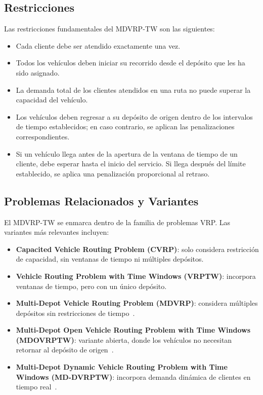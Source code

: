 \documentclass[letter, 10pt, dvipdfmx]{article}
\begin{document}
\subsection{Restricciones}

Las restricciones fundamentales del MDVRP-TW son las siguientes:

\begin{itemize}
  \item Cada cliente debe ser atendido exactamente una vez.
  \item Todos los vehículos deben iniciar su recorrido desde el depósito que les ha sido asignado.
  \item La demanda total de los clientes atendidos en una ruta no puede superar la capacidad del vehículo.
  \item Los vehículos deben regresar a su depósito de origen dentro de los intervalos de tiempo establecidos; en caso contrario, se aplican las penalizaciones correspondientes.
  \item Si un vehículo llega antes de la apertura de la ventana de tiempo de un cliente, debe esperar hasta el inicio del servicio. Si llega después del límite establecido, se aplica una penalización proporcional al retraso.
\end{itemize}

\subsection{Problemas Relacionados y Variantes}

El MDVRP-TW se enmarca dentro de la familia de problemas VRP. Las variantes más relevantes incluyen:
\begin{itemize}
  \item \textbf{Capacited Vehicle Routing Problem (CVRP)}: solo considera restricción de capacidad, sin ventanas de tiempo ni múltiples depósitos.
  \item \textbf{Vehicle Routing Problem with Time Windows (VRPTW)}: incorpora ventanas de tiempo, pero con un único depósito.
  \item \textbf{Multi-Depot Vehicle Routing Problem (MDVRP)}: considera múltiples depósitos sin restricciones de tiempo~\cite{Vidal2012}.
  \item \textbf{Multi-Depot Open Vehicle Routing Problem with Time Windows (MDOVRPTW)}: variante abierta, donde los vehículos no necesitan retornar al depósito de origen~\cite{Sadati2021}.
  \item \textbf{Multi-Depot Dynamic Vehicle Routing Problem with Time Windows (MD-DVRPTW)}: incorpora demanda dinámica de clientes en tiempo real~\cite{Wang2024}.
\end{itemize}
\end{document}
